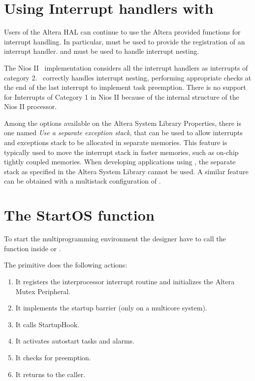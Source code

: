 \section[Interrupts]{Using Interrupt handlers with \ee}

Users of the Altera HAL can continue to use the Altera provided
functions for interrupt handling. In particular,
 must be used to provide the registration of an
interrupt handler.   and
 must be used to handle interrupt
nesting. 

The Nios II \ee\ implementation considers all the interrupt handlers as
interrupts of category 2. \ee\ correctly handles
interrupt nesting, performing appropriate checks at the end of the
last interrupt to implement task preemption. There is no support for
Interrupts of Category 1 in Nios II because of
the internal structure of the Nios II processor.

Among the options available on the Altera System Library Properties,
there is one named {\em Use a separate exception stack}, that can be used to allow interrupts and exceptions
stack to be allocated in separate memories. This feature is typically
used to move the interrupt stack in faster memories, such as on-chip
tightly coupled memories. When developing applications using \ee, the
separate stack as specified in the Altera System Library cannot be
used. A similar feature can be obtained with a multistack
configuration of \ee.



\section{The StartOS function}

To start the multiprogramming environment the designer have to call
the  function inside  or
.

The  primitive does the following actions:
\begin{enumerate}
\item It registers the interprocessor interrupt routine and
  initializes the Altera Mutex Peripheral.
\item It implements the startup barrier (only on a multicore system).
\item It calls StartupHook.
\item It activates autostart tasks and alarms.
\item It checks for preemption.
\item It returns to the caller.
\end{enumerate}

